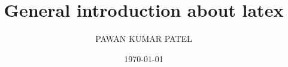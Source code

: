 \documentclass[a4paper,12pt]{article}
\begin{document}


\title{General introduction about  latex}
\author{PAWAN KUMAR PATEL}
\date{\today}
\maketitle
\end{document}
